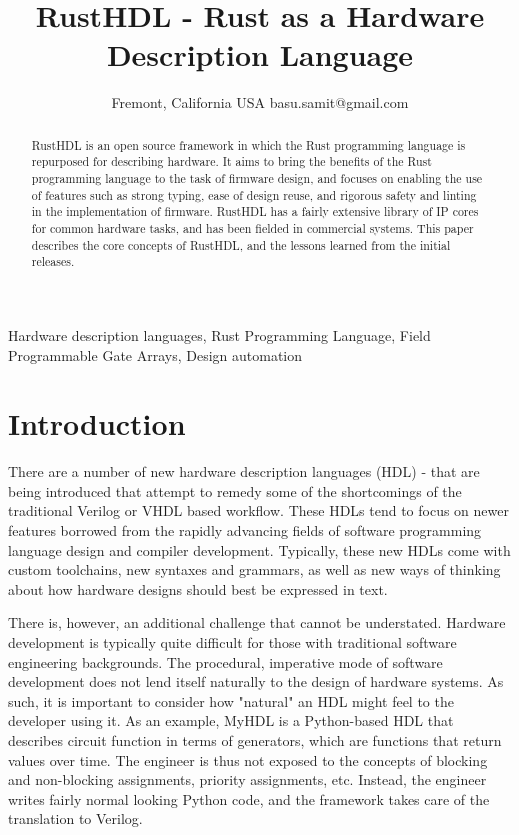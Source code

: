 \documentclass[conference]{IEEEtran}
\begin{document}
\title{RustHDL - Rust as a Hardware Description Language}

\author{
  Fremont, California
  USA
  basu.samit@gmail.com
}

\maketitle

\begin{abstract}
  RustHDL is an open source framework in which the Rust programming language is repurposed for 
  describing hardware.  It aims to bring the benefits of the Rust programming language to the 
  task of firmware design, and focuses on enabling the use
  of features such as strong typing, ease of design reuse, and rigorous safety and linting in
  the implementation of firmware.  RustHDL has a fairly extensive library of IP cores for 
  common hardware tasks, and has been fielded in commercial systems.  This paper describes the
  core concepts of RustHDL, and the lessons learned from the initial releases.
\end{abstract}

\begin{IEEEkeywords}
  Hardware description languages, Rust Programming Language, Field Programmable Gate Arrays,
  Design automation
\end{IEEEkeywords}


\section{Introduction}
There are a number of new hardware description languages (HDL) \cite{b1}-\cite{b5} that are being introduced that
attempt to remedy some of the shortcomings of the traditional Verilog or VHDL based workflow.
These HDLs tend to focus on newer features borrowed from the rapidly advancing fields of
software programming language design and compiler development.  Typically, these new HDLs
come with custom toolchains, new syntaxes and grammars, as well as new ways of thinking about
how hardware designs should best be expressed in text.

There is, however, an additional challenge that cannot be understated.  Hardware development
is typically quite difficult for those with traditional software engineering backgrounds.
The procedural, imperative mode of software development does not lend itself naturally to
the design of hardware systems.  As such, it is important to consider how "natural" an HDL
might feel to the developer using it.  As an example, MyHDL \cite{b3} is a Python-based HDL
that describes circuit function in terms of generators, which are functions that return
values over time.  The engineer is thus not exposed to the concepts of blocking and non-blocking 
assignments, priority assignments, etc.  Instead, the engineer writes fairly normal looking 
Python code, and the framework takes care of the translation to Verilog.
\end{document}
